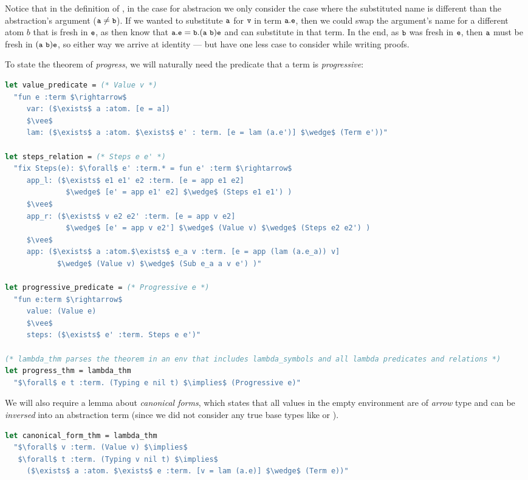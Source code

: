\documentclass[english, mgr]{iithesis}
\renewcommand{\tt}[1]{\texttt{\small{#1}}}
\newcommand{\lstt}[1]{{\text{\lstinline[columns=fixed,mathescape]{#1}}}}
\renewcommand{\it}[1]{\textit{#1}}
\begin{document}
Notice that in the definition of \lstt{Sub}, in the case for abstracion we only consider the case where the substituted name is different than the abstraction's argument ($\tt{a} \cneq \tt{b}$).
If we wanted to substitute $\tt{a}$ for $\tt{v}$ in term $\tbind{\tt{a}}\tt{e}$, then we could swap the argument's name for a different atom $b$ that is fresh in $\tt{e}$, as then know that $\tbind{\tt{a}}\tt{e} \ceq \tbind{\tt{b}}\permswap{\tt{a}}{\tt{b}}\tt{e}$ and can substitute in that term.
In the end, as $\tt{b}$ was fresh in $\tt{e}$, then $\tt{a}$
must be fresh in $\permswap{\tt{a}}{\tt{b}}\tt{e}$, so either way
we arrive at identity --- but have one less case to consider
while writing proofs.

To state the theorem of \it{progress}, we will naturally need the predicate
that a term is \it{progressive}:
\begin{lstlisting}[mathescape,language=OCaml, escapebegin=\color{codepurple}]
let value_predicate = (* Value v *)
  "fun e :term $\rightarrow$
     var: ($\exists$ a :atom. [e = a])
     $\vee$
     lam: ($\exists$ a :atom. $\exists$ e' : term. [e = lam (a.e')] $\wedge$ (Term e'))"

let steps_relation = (* Steps e e' *)
  "fix Steps(e): $\forall$ e' :term.* = fun e' :term $\rightarrow$
     app_l: ($\exists$ e1 e1' e2 :term. [e = app e1 e2]
              $\wedge$ [e' = app e1' e2] $\wedge$ (Steps e1 e1') )
     $\vee$
     app_r: ($\exists$ v e2 e2' :term. [e = app v e2]
              $\wedge$ [e' = app v e2'] $\wedge$ (Value v) $\wedge$ (Steps e2 e2') )
     $\vee$
     app: ($\exists$ a :atom.$\exists$ e_a v :term. [e = app (lam (a.e_a)) v]
            $\wedge$ (Value v) $\wedge$ (Sub e_a a v e') )"

let progressive_predicate = (* Progressive e *)
  "fun e:term $\rightarrow$
     value: (Value e)
     $\vee$
     steps: ($\exists$ e' :term. Steps e e')"

(* lambda_thm parses the theorem in an env that includes lambda_symbols and all lambda predicates and relations *)
let progress_thm = lambda_thm
  "$\forall$ e t :term. (Typing e nil t) $\implies$ (Progressive e)"
\end{lstlisting}
We will also require a lemma about \it{canonical forms},
which states that all values in the empty environment
are of \it{arrow} type and can be \it{inversed} into an abstraction term
(since we did not consider any true base types like \lstt{Bool} or \lstt{Int}).
\begin{lstlisting}[mathescape,language=OCaml, escapebegin=\color{codepurple}]
let canonical_form_thm = lambda_thm
  "$\forall$ v :term. (Value v) $\implies$
   $\forall$ t :term. (Typing v nil t) $\implies$
     ($\exists$ a :atom. $\exists$ e :term. [v = lam (a.e)] $\wedge$ (Term e))"
\end{lstlisting}
\end{document}
